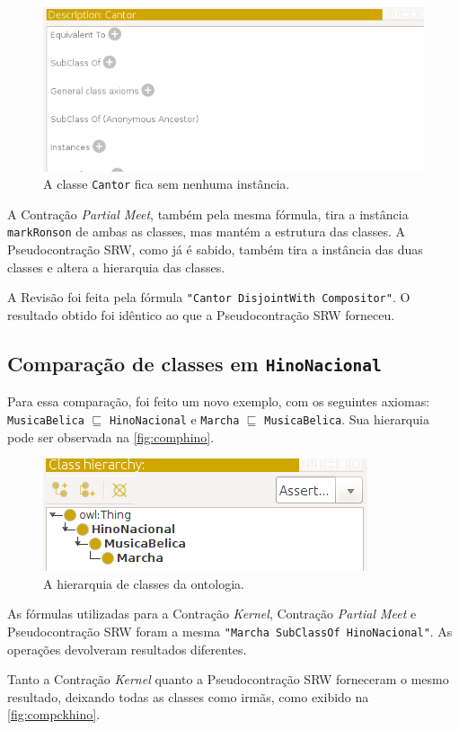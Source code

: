 \begin{figure}[H]
	\centering
	\includegraphics[width=0.5\linewidth]{Capitulos/Testes/compckcantor3}
	\caption{A classe \texttt{Cantor} fica sem nenhuma instância.}
	\label{fig:compckcantor3}
\end{figure}

A Contração \textit{Partial Meet}, também pela mesma fórmula, tira a instância \texttt{markRonson} de ambas as classes, mas mantém a estrutura das classes. A Pseudocontração SRW, como já é sabido, também tira a instância das duas classes e altera a hierarquia das classes.

A Revisão foi feita pela fórmula \texttt{"Cantor DisjointWith Compositor"}. O resultado obtido foi idêntico ao que a Pseudocontração SRW forneceu. 

\subsection{Comparação de classes em \texttt{HinoNacional}}

Para essa comparação, foi feito um novo exemplo, com os seguintes axiomas: \texttt{MusicaBelica} $ \sqsubseteq $ \texttt{HinoNacional} e \texttt{Marcha} $ \sqsubseteq $ \texttt{MusicaBelica}. Sua hierarquia pode ser observada na \autoref{fig:comphino}. 

\begin{figure}[H]
	\centering
	\includegraphics[width=0.5\linewidth]{Capitulos/Testes/comphino}
	\caption{A hierarquia de classes da ontologia.}
	\label{fig:comphino}
\end{figure}

As fórmulas utilizadas para a Contração \textit{Kernel}, Contração \textit{Partial Meet} e Pseudocontração SRW foram a mesma \texttt{"Marcha SubClassOf HinoNacional"}. As operações devolveram resultados diferentes.

Tanto a Contração \textit{Kernel} quanto a Pseudocontração SRW forneceram o mesmo resultado, deixando todas as classes como irmãs, como exibido na \autoref{fig:compckhino}.

